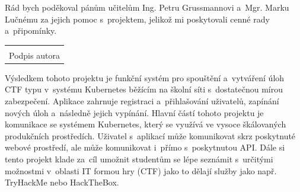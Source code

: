 \documentclass[12pt, a4paper,
oneside,      %
openright
]{report}
\newcommand\datumOdevzdani{6. 1. 2025} %
\begin{document}

	
	\noindent Rád bych poděkoval pánům učitelům Ing. Petru Grussmannovi a~Mgr. Marku Lučnému za jejich pomoc s~projektem, jelikož mi poskytovali cenné rady a~připomínky.

	
	\vspace*{0.7\textheight} %

	\vfill
	\noindent{V Opavě \datumOdevzdani\\}
	\noindent
	\begin{minipage}{\linewidth}
		\hspace{9.5cm} 
		\begin{tabular}{@{}p{6cm}@{}}
			\dotfill \\
			Podpis autora
		\end{tabular}
	\end{minipage}
	
	\cleardoublepage %


	\noindent Výsledkem tohoto projektu je funkční systém pro spouštění a~vytváření úloh CTF typu v~systému Kubernetes běžícím na školní síti s~dostatečnou mírou zabezpečení. Aplikace zahrnuje registraci a~přihlašování uživatelů, zapínání nových úloh a~následně jejich vypínání. Hlavní částí tohoto projektu je komunikace se systémem Kubernetes, který se využívá ve vysoce škálovaných produkčních prostředích. Uživatel s~aplikací může komunikovat skrz poskytnuté webové prostředí, ale může komunikovat i~přímo s~poskytnutou API. Dále si tento projekt klade za~cíl umožnit studentům se lépe seznámit s~určitými možnostmi v~oblasti IT formou hry (CTF) jako to dělají služby jako např. TryHackMe nebo HackTheBox.
	
\end{document}
